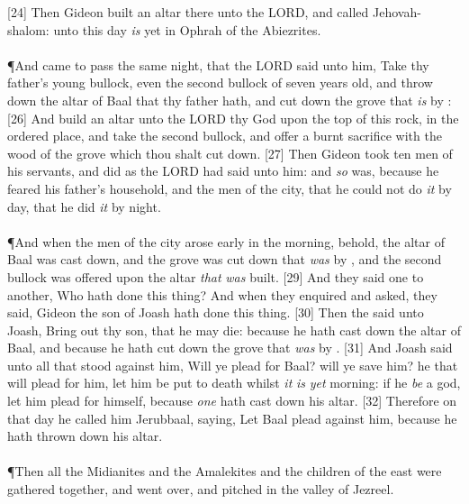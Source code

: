 [24] \textcolor[cmyk]{0.99998,1,0,0}{Then Gideon built an altar there unto the LORD, and called  Jehovah-shalom: unto this day  \emph{is} yet in Ophrah of the Abiezrites.}\\
\\
\P \textcolor[cmyk]{0.99998,1,0,0}{And  came to pass the same night, that the LORD said unto him, Take thy father's young bullock, even the second bullock of seven years old, and throw down the altar of Baal that thy father hath, and cut down the grove that \emph{is} by :}
[26] \textcolor[cmyk]{0.99998,1,0,0}{And build an altar unto the LORD thy God upon the top of this rock, in the ordered place, and take the second bullock, and offer a burnt sacrifice with the wood of the grove which thou shalt cut down.}
[27] \textcolor[cmyk]{0.99998,1,0,0}{Then Gideon took ten men of his servants, and did as the LORD had said unto him: and \emph{so}  was, because he feared his father's household, and the men of the city, that he could not do \emph{it} by day, that he did \emph{it} by night.}\\
\\
\P \textcolor[cmyk]{0.99998,1,0,0}{And when the men of the city arose early in the morning, behold, the altar of Baal was cast down, and the grove was cut down that \emph{was} by , and the second bullock was offered upon the altar \emph{that} \emph{was} built.}
[29] \textcolor[cmyk]{0.99998,1,0,0}{And they said one to another, Who hath done this thing? And when they enquired and asked, they said, Gideon the son of Joash hath done this thing.}
[30] \textcolor[cmyk]{0.99998,1,0,0}{Then the  said unto Joash, Bring out thy son, that he may die: because he hath cast down the altar of Baal, and because he hath cut down the grove that \emph{was} by .}
[31] \textcolor[cmyk]{0.99998,1,0,0}{And Joash said unto all that stood against him, Will ye plead for Baal? will ye save him? he that will plead for him, let him be put to death whilst \emph{it} \emph{is} \emph{yet} morning: if he \emph{be} a god, let him plead for himself, because \emph{one} hath cast down his altar.}
[32] \textcolor[cmyk]{0.99998,1,0,0}{Therefore on that day he called him Jerubbaal, saying, Let Baal plead against him, because he hath thrown down his altar.}\\
\\
\P \textcolor[cmyk]{0.99998,1,0,0}{Then all the Midianites and the Amalekites and the children of the east were gathered together, and went over, and pitched in the valley of Jezreel.}
